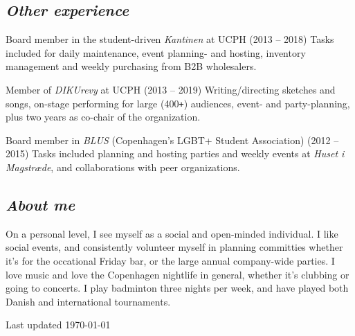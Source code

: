 \documentclass[10pt, a4paper]{article}
\begin{document}
\subsection*{\textit{Other experience}}
\begin{outline}
  \1 Board member in the student-driven \textit{Kantinen} at UCPH (2013 -- 2018)\newline
    {\footnotesize Tasks included for daily maintenance, event planning- and hosting, inventory management and weekly purchasing from B2B wholesalers.}

  \1 Member of \textit{DIKUrevy} at UCPH (2013 -- 2019)\newline
    {\footnotesize Writing/directing sketches and songs, on-stage performing for large (400\texttt{+}) audiences, event- and party-planning, plus two years as co-chair of the organization.}

  \1 Board member in \textit{BLUS} (Copenhagen's LGBT+ Student Association)  (2012 -- 2015)\newline
    {\footnotesize Tasks included planning and hosting parties and weekly events at \textit{Huset i Magstræde}, and collaborations with peer organizations.}
\end{outline}
\vspace*{\fill}
\subsection*{\textit{About me}}
On a personal level, I see myself as a social and open-minded individual.
I like social events, and consistently volunteer myself in planning committies whether it's for the occational Friday bar, or the large annual company-wide parties.
I love music and love the Copenhagen nightlife in general, whether it's clubbing or going to concerts.
I play badminton three nights per week, and have played both Danish and international tournaments.
\vspace*{\fill}
\begin{flushright} 
  Last updated \today
\end{flushright}
\end{document}
